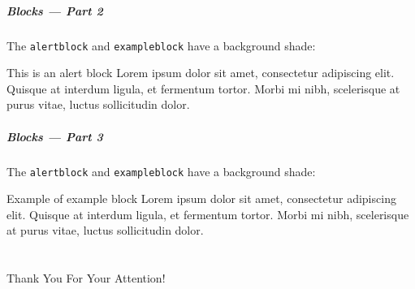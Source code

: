 \documentclass[17pt,aspectratio=169]{beamer}
\begin{document}
\begin{frame}
  \frametitle{Blocks --- Part 2}
  The \texttt{alertblock} and \texttt{exampleblock} have a background shade:
  \begin{alertblock}{This is an alert block}
    Lorem ipsum dolor sit amet, consectetur adipiscing elit. Quisque at interdum
    ligula, et fermentum tortor. Morbi mi nibh, scelerisque at purus vitae,
    luctus sollicitudin dolor.
  \end{alertblock}
\end{frame}

\begin{frame}
  \frametitle{Blocks --- Part 3}
  The \texttt{alertblock} and \texttt{exampleblock} have a background shade:
  \begin{exampleblock}{Example of example block}
    Lorem ipsum dolor sit amet, consectetur adipiscing elit. Quisque at interdum
    ligula, et fermentum tortor. Morbi mi nibh, scelerisque at purus vitae,
    luctus sollicitudin dolor.
  \end{exampleblock}
\end{frame}

\part{} %
\begin{frame}
  \begin{center}
    \LARGE Thank You For Your Attention!
  \end{center}
\end{frame}
\end{document}
